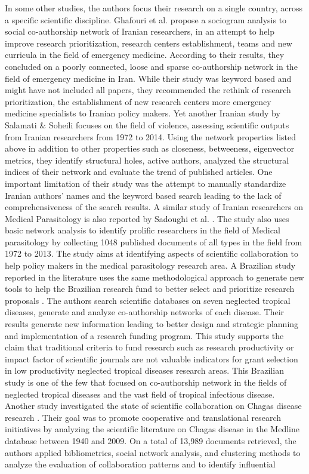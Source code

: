 In some other studies, the authors focus their research on a single country, across a specific scientific discipline. Ghafouri et al. \cite{ghafouri_social_2014} propose a sociogram analysis to social co-authorship network of Iranian researchers, in an attempt to help improve research prioritization, research centers establishment, teams and new curricula in the field of emergency medicine. According to their results, they concluded on a poorly connected, loose and sparse co-authorship network in the field of emergency medicine in Iran. While their study was keyword based and might have not included all papers, they recommended the rethink of research prioritization, the establishment of new research centers more emergency medicine specialists to Iranian policy makers. Yet another Iranian study by Salamati \& Soheili \cite{salamati_social_2016} focuses on the field of violence, assessing scientific outputs from Iranian researchers from 1972 to 2014. Using the network properties listed above in addition to other properties such as closeness, betweeness, eigenvector metrics, they identify structural holes, active authors, analyzed the structural indices of their network and evaluate the trend of published articles. One important limitation of their study was the attempt to manually standardize Iranian authors’ names and the keyword based search leading to the lack of comprehensiveness of the search results. A similar study of Iranian researchers on Medical Parasitology is also reported by Sadoughi et al. \cite{sadoughi_social_2016}. The study also uses basic network analysis to identify prolific researchers in the field of Medical parasitology by collecting 1048 published documents of all types in the field from 1972 to 2013. The study aims at identifying aspects of scientific collaboration to help policy makers in the medical parasitology research area. A Brazilian study reported in the literature uses the same methodological approach to generate new tools to help the Brazilian research fund to better select and prioritize research proposals \cite{morel_co-authorship_2009}. The authors search scientific databases on seven neglected tropical diseases, generate and analyze co-authorship networks of each disease. Their results generate new information leading to better design and strategic planning and implementation of a research funding program. This study supports the claim that traditional criteria to fund research such as research productivity or impact factor of scientific journals are not valuable indicators for grant selection in low productivity neglected tropical diseases research areas. This Brazilian study is one of the few that focused on co-authorship network in the fields of neglected tropical diseases and the vast field of tropical infectious disease. Another study investigated the state of scientific collaboration on Chagas disease research \cite{gonzalez-alcaide_scientific_2012}. Their goal was to promote cooperative and translational research initiatives by analyzing the scientific literature on Chagas disease in the Medline database between 1940 and 2009. On a total of 13,989 documents retrieved, the authors applied bibliometrics, social network analysis, and clustering methods to analyze the evaluation of collaboration patterns and to identify influential 